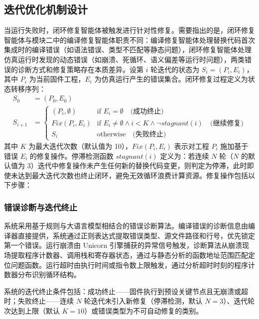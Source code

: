 \subsection{迭代优化机制设计}

当运行失败时，闭环修复智能体被触发进行针对性修复。需要指出的是，闭环修复智能体与模块二中的编译修复智能体职责不同：编译修复智能体处理替换代码首次集成时的编译错误（如语法错误、类型不匹配等静态问题），闭环修复智能体处理仿真运行时发现的动态错误（如崩溃、死循环、语义偏差等运行时问题），两类错误的诊断方式和修复策略存在本质差异。设第 $i$ 轮迭代的状态为 $S_i = (P_i, E_i)$，其中 $P_i$ 为当前固件工程，$E_i$ 为仿真运行产生的错误集合。闭环修复过程定义为状态转移序列：
\begin{align}
S_0 &= (P_0, E_0) \nonumber \\
S_{i+1} &= \begin{cases}
(P_i, \emptyset) & \text{if } E_i = \emptyset \quad \textit{(成功终止)} \\
\textit{Fix}(P_i, E_i) & \text{if } E_i \neq \emptyset \land i < K \land \neg\textit{stagnant}(i) \quad \textit{(继续修复)} \\
S_i & \text{otherwise} \quad \textit{(失败终止)}
\end{cases} \label{eq:iterate}
\end{align}
其中 $K$ 为最大迭代次数（默认值为 10），$\textit{Fix}(P_i, E_i)$ 表示对工程 $P_i$ 施加基于错误 $E_i$ 的修复操作。停滞检测函数 $\textit{stagnant}(i)$ 定义为：若连续 $N$ 轮（$N$ 的默认值为 3）迭代中修复操作未产生任何新的替换代码变更，则判定为停滞，此时即使未达到最大迭代次数也终止闭环，避免无效循环浪费计算资源。修复操作包括以下步骤：

\subsubsection{错误诊断与迭代终止}

系统采用基于规则与大语言模型相结合的错误诊断算法。编译错误的诊断信息由编译器直接提供，系统通过正则表达式提取错误类型、源文件路径和行号，优先锁定第一个错误。运行崩溃由 Unicorn 引擎捕获的异常信号触发，诊断算法从崩溃现场提取程序计数器、调用栈和寄存器状态，通过与静态分析的函数地址范围匹配定位问题函数。运行超时由执行时间或指令数上限触发，通过分析超时时刻的程序计数器分布识别循环结构。

系统的迭代终止条件包括：成功终止——固件执行到预设关键节点且无崩溃或超时；失败终止——连续 $N$ 轮迭代未引入新修复（停滞检测，默认 $N=3$）、迭代轮次达到上限（默认 $K=10$）或错误类型为不可自动修复的类别。

